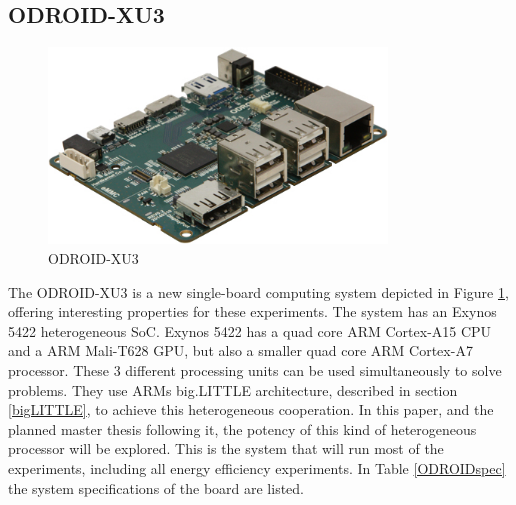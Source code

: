 \subsection{ODROID-XU3} \label{OdroidXU3}
\begin{figure}[H]
  \centering
  \includegraphics[width=90mm]{fig/ODROID.jpg}
  \caption{ODROID-XU3 \label{ODROIDImage}}
\end{figure}
The ODROID-XU3 is a new single-board computing system depicted in Figure \ref{ODROIDImage}, offering interesting properties for these experiments.
The system has an Exynos 5422 heterogeneous SoC.
Exynos 5422 has a quad core ARM Cortex-A15 CPU and a ARM Mali-T628 GPU, but also a smaller quad core ARM Cortex-A7 processor.
These 3 different processing units can be used simultaneously to solve problems.
They use ARMs big.LITTLE architecture, described in section \ref{bigLITTLE}, to achieve this heterogeneous cooperation.
In this paper, and the planned master thesis following it, the potency of this kind of heterogeneous processor will be explored.
This is the system that will run most of the experiments, including all energy efficiency experiments.
In Table \ref{ODROIDspec} the system specifications of the board are listed.

